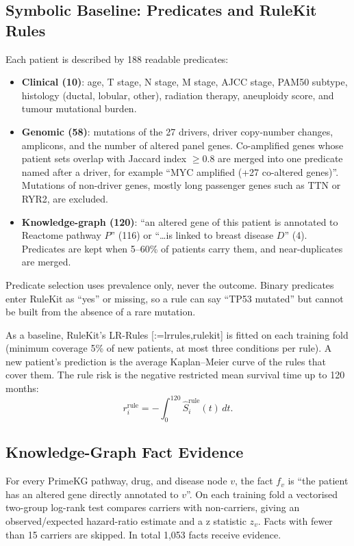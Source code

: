 \documentclass{mnnit}
\makeatletter
\newcommand{\rc}[1]{[\def\rc@sep{}\@for\rc@key:=#1\do{\rc@sep\ref{ref:\rc@key}\def\rc@sep{, }}]}
\makeatother
\begin{document}
\subsection{Symbolic Baseline: Predicates and RuleKit Rules}
Each patient is described by 188 readable predicates:
\begin{itemize}
  \item \textbf{Clinical (10)}: age, T stage, N stage, M stage, AJCC stage, PAM50 subtype, histology (ductal,
        lobular, other), radiation therapy, aneuploidy score, and tumour mutational burden.
  \item \textbf{Genomic (58)}: mutations of the 27 drivers, driver copy-number changes, amplicons, and the number of
        altered panel genes. Co-amplified genes whose patient sets overlap with Jaccard index $\ge 0.8$ are merged
        into one predicate named after a driver, for example ``MYC amplified (+27 co-altered genes)''. Mutations
        of non-driver genes, mostly long passenger genes such as TTN or RYR2, are excluded.
  \item \textbf{Knowledge-graph (120)}: ``an altered gene of this patient is annotated to Reactome pathway $P$''
        (116) or ``\ldots is linked to breast disease $D$'' (4). Predicates are kept when 5--60\% of patients carry
        them, and near-duplicates are merged.
\end{itemize}
Predicate selection uses prevalence only, never the outcome. Binary predicates enter RuleKit as ``yes'' or
missing, so a rule can say ``TP53 mutated'' but cannot be built from the absence of a rare mutation.

As a baseline, RuleKit's LR-Rules \rc{lrrules,rulekit} is fitted on each training fold (minimum coverage 5\% of new patients, at
most three conditions per rule). A new patient's prediction is the average Kaplan--Meier curve of the rules that
cover them. The rule risk is the negative restricted mean survival time up to 120 months:
\begin{equation}
  r^{\text{rule}}_i = -\int_0^{120} \hat{S}^{\text{rule}}_i(t)\,dt .
\end{equation}

\subsection{Knowledge-Graph Fact Evidence}\label{sec:kgevidence}
For every PrimeKG pathway, drug, and disease node $v$, the fact $f_v$ is ``the patient has an altered gene directly
annotated to $v$''. On each training fold a vectorised two-group log-rank test compares carriers with
non-carriers, giving an observed/expected hazard-ratio estimate and a z statistic $z_v$. Facts with fewer than 15
carriers are skipped. In total 1,053 facts receive evidence.
\end{document}
